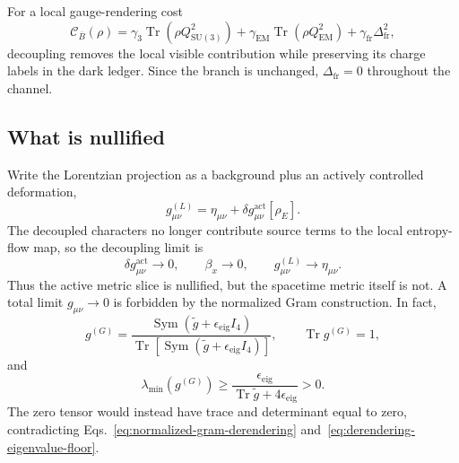 For a local gauge-rendering cost
\begin{equation}
  \mathcal C_{\overline B}(\rho)
  =\gamma_3\operatorname{Tr}(\rho Q_{\mathrm{SU}(3)}^2)
  +\gamma_{\mathrm{EM}}\operatorname{Tr}(\rho Q_{\mathrm{EM}}^2)
  +\gamma_{\mathrm{fr}}\Delta_{\mathrm{fr}}^2,
  \label{eq:gauge-rendering-cost}
\end{equation}
decoupling removes the local visible contribution while preserving its
charge labels in the dark ledger.  Since the branch is unchanged,
\(\Delta_{\mathrm{fr}}=0\) throughout the channel.

\subsection{What is nullified}

Write the Lorentzian projection as a background plus an actively controlled
deformation,
\begin{equation}
  g_{\mu\nu}^{(L)}
  =\eta_{\mu\nu}+\delta g_{\mu\nu}^{\mathrm{act}}[\rho_E].
  \label{eq:active-metric-decomposition}
\end{equation}
The decoupled characters no longer contribute source terms to the local
entropy-flow map, so the decoupling limit is
\begin{equation}
  \delta g_{\mu\nu}^{\mathrm{act}}\longrightarrow0,
  \qquad
  \beta_x\longrightarrow0,
  \qquad
  g_{\mu\nu}^{(L)}\longrightarrow\eta_{\mu\nu}.
  \label{eq:derendering-background-restoration}
\end{equation}
Thus the active metric slice is nullified, but the spacetime metric itself is
not.  A total limit \(g_{\mu\nu}\to0\) is forbidden by the normalized Gram
construction.  In fact,
\begin{equation}
  g^{(G)}
  =\frac{\operatorname{Sym}(\widetilde g+\epsilon_{\mathrm{eig}}I_4)}
  {\operatorname{Tr}[\operatorname{Sym}(\widetilde g+
  \epsilon_{\mathrm{eig}}I_4)]},
  \qquad
  \operatorname{Tr}g^{(G)}=1,
  \label{eq:normalized-gram-derendering}
\end{equation}
and
\begin{equation}
  \lambda_{\min}(g^{(G)})
  \geq
  \frac{\epsilon_{\mathrm{eig}}}
  {\operatorname{Tr}\widetilde g+4\epsilon_{\mathrm{eig}}}
  >0.
  \label{eq:derendering-eigenvalue-floor}
\end{equation}
The zero tensor would instead have trace and determinant equal to zero,
contradicting Eqs.~\eqref{eq:normalized-gram-derendering} and~\eqref{eq:derendering-eigenvalue-floor}.

